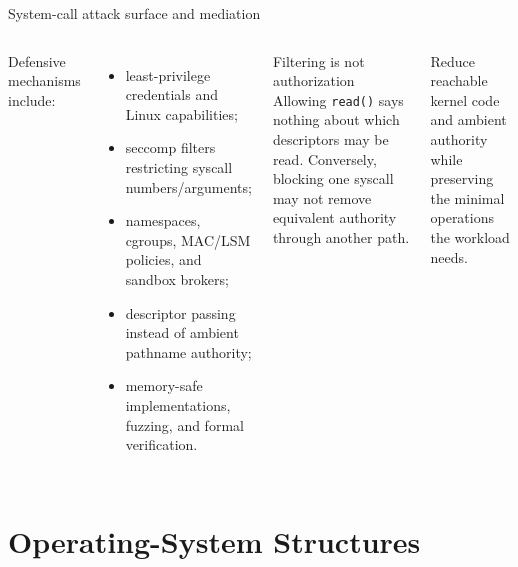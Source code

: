 \documentclass[aspectratio=169,11pt]{beamer}
\newcommand{\code}[1]{\texttt{#1}}
\begin{document}
\begin{frame}{System-call attack surface and mediation}
  \begin{columns}[T,onlytextwidth]
      Defensive mechanisms include:
      \begin{itemize}
        \item least-privilege credentials and Linux capabilities;
        \item seccomp filters restricting syscall numbers/arguments;
        \item namespaces, cgroups, MAC/LSM policies, and sandbox brokers;
        \item descriptor passing instead of ambient pathname authority;
        \item memory-safe implementations, fuzzing, and formal verification.
      \end{itemize}
      \begin{alertblock}{Filtering is not authorization}
        Allowing \code{read()} says nothing about which descriptors may be read. Conversely, blocking one syscall may not remove equivalent authority through another path.
      \end{alertblock}
      \begin{tcolorbox}[title=Design objective]
        Reduce reachable kernel code and ambient authority while preserving the minimal operations the workload needs.
      \end{tcolorbox}
  \end{columns}
\end{frame}

\section{Operating-System Structures}
\end{document}

